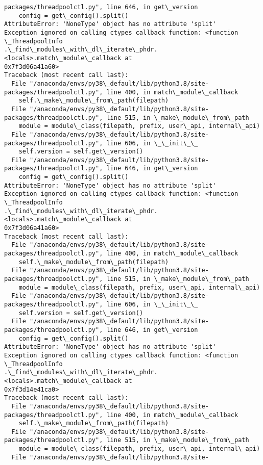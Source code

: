 \documentclass[11pt]{article}
\begin{document}
\begin{Verbatim}[commandchars=\\\{\}]
packages/threadpoolctl.py", line 646, in get\_version
    config = get\_config().split()
AttributeError: 'NoneType' object has no attribute 'split'
Exception ignored on calling ctypes callback function: <function \_ThreadpoolInfo
.\_find\_modules\_with\_dl\_iterate\_phdr.<locals>.match\_module\_callback at
0x7f3d06a41a60>
Traceback (most recent call last):
  File "/anaconda/envs/py38\_default/lib/python3.8/site-
packages/threadpoolctl.py", line 400, in match\_module\_callback
    self.\_make\_module\_from\_path(filepath)
  File "/anaconda/envs/py38\_default/lib/python3.8/site-
packages/threadpoolctl.py", line 515, in \_make\_module\_from\_path
    module = module\_class(filepath, prefix, user\_api, internal\_api)
  File "/anaconda/envs/py38\_default/lib/python3.8/site-
packages/threadpoolctl.py", line 606, in \_\_init\_\_
    self.version = self.get\_version()
  File "/anaconda/envs/py38\_default/lib/python3.8/site-
packages/threadpoolctl.py", line 646, in get\_version
    config = get\_config().split()
AttributeError: 'NoneType' object has no attribute 'split'
Exception ignored on calling ctypes callback function: <function \_ThreadpoolInfo
.\_find\_modules\_with\_dl\_iterate\_phdr.<locals>.match\_module\_callback at
0x7f3d06a41a60>
Traceback (most recent call last):
  File "/anaconda/envs/py38\_default/lib/python3.8/site-
packages/threadpoolctl.py", line 400, in match\_module\_callback
    self.\_make\_module\_from\_path(filepath)
  File "/anaconda/envs/py38\_default/lib/python3.8/site-
packages/threadpoolctl.py", line 515, in \_make\_module\_from\_path
    module = module\_class(filepath, prefix, user\_api, internal\_api)
  File "/anaconda/envs/py38\_default/lib/python3.8/site-
packages/threadpoolctl.py", line 606, in \_\_init\_\_
    self.version = self.get\_version()
  File "/anaconda/envs/py38\_default/lib/python3.8/site-
packages/threadpoolctl.py", line 646, in get\_version
    config = get\_config().split()
AttributeError: 'NoneType' object has no attribute 'split'
Exception ignored on calling ctypes callback function: <function \_ThreadpoolInfo
.\_find\_modules\_with\_dl\_iterate\_phdr.<locals>.match\_module\_callback at
0x7f3d14e41ca0>
Traceback (most recent call last):
  File "/anaconda/envs/py38\_default/lib/python3.8/site-
packages/threadpoolctl.py", line 400, in match\_module\_callback
    self.\_make\_module\_from\_path(filepath)
  File "/anaconda/envs/py38\_default/lib/python3.8/site-
packages/threadpoolctl.py", line 515, in \_make\_module\_from\_path
    module = module\_class(filepath, prefix, user\_api, internal\_api)
  File "/anaconda/envs/py38\_default/lib/python3.8/site-

\end{Verbatim}
\end{document}
